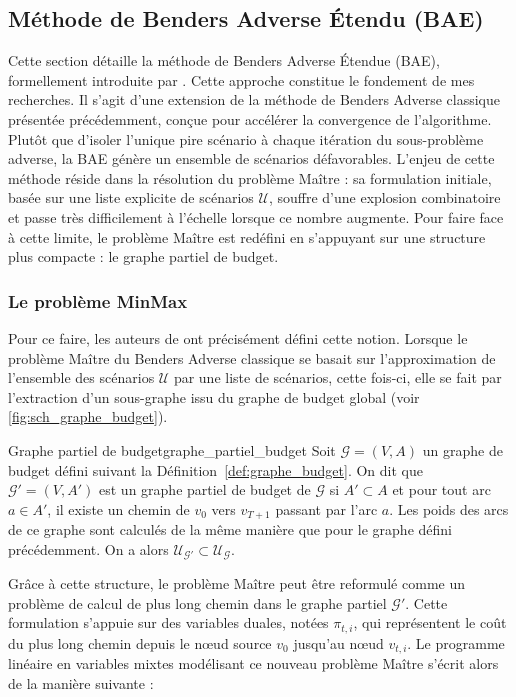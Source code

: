 \documentclass[12pt, a4paper, twoside]{report}
\numberwithin{equation}{section}
\newcommand{\mmx}{\textbf{MinMax} }
\begin{document}
\begin{Figure}[H]
	\subsection{Méthode de Benders Adverse Étendu (BAE)}
	
	Cette section détaille la méthode de Benders Adverse Étendue (BAE), formellement introduite par \cite{portoleauTHESIS}. Cette approche constitue le fondement de mes recherches. Il s'agit d'une extension de la méthode de Benders Adverse classique présentée précédemment, conçue pour accélérer la convergence de l'algorithme. Plutôt que d'isoler l'unique pire scénario à chaque itération du sous-problème adverse, la BAE génère un ensemble de scénarios défavorables. L'enjeu de cette méthode réside dans la résolution du problème Maître : sa formulation initiale, basée sur une liste explicite de scénarios  $\mathcal{U}$, souffre d'une explosion combinatoire et passe très difficilement à l'échelle lorsque ce nombre augmente. Pour faire face à cette limite, le problème Maître est redéfini en s'appuyant sur une structure plus compacte : le graphe partiel de budget.
	
	\subsubsection{Le problème \mmx}
	
	Pour ce faire, les auteurs de \cite{portoleauTHESIS} ont précisément défini cette notion. Lorsque le problème Maître du Benders Adverse classique se basait sur l'approximation de l'ensemble des scénarios $\mathcal{U}$ par une liste de scénarios, cette fois-ci, elle se fait par l'extraction d'un sous-graphe issu du graphe de budget global (voir \ref{fig:sch_graphe_budget}).
	
	\begin{definition}{Graphe partiel de budget}{graphe_partiel_budget}
		Soit $\mathcal{G}=(V, A)$ un graphe de budget défini suivant la Définition~\ref{def:graphe_budget}. On dit que $\mathcal{G}'=(V, A')$ est un graphe partiel de budget de $\mathcal{G}$ si $A'\subset A$ et pour tout arc $a\in A'$, il existe un chemin de $v_0$ vers $v_{T+1}$ passant par l'arc $a$. Les poids des arcs de ce graphe sont calculés de la même manière que pour le graphe défini précédemment. On a alors $\mathcal{U}_{\mathcal{G}'}\subset \mathcal{U}_{\mathcal{G}}$.
	\end{definition}
	
	Grâce à cette structure, le problème Maître peut être reformulé comme un problème de calcul de plus long chemin dans le graphe partiel $\mathcal{G}'$. Cette formulation s'appuie sur des variables duales, notées $\pi_{t,i}$, qui représentent le coût du plus long chemin depuis le nœud source $v_0$ jusqu'au nœud $v_{t,i}$. Le programme linéaire en variables mixtes modélisant ce nouveau problème Maître s'écrit alors de la manière suivante :
	

\end{Figure}
\end{document}
